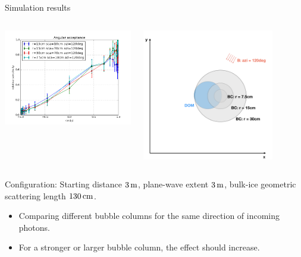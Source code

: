 \begin{frame}[fragile]{Simulation results}
  \begin{columns}
    \begin{column}{0.5\textwidth}
      \includegraphics[width=\textwidth]{img/summer_scenario_azi120deg}
    \end{column}
    \begin{column}{0.5\textwidth}
      \includegraphics[width=0.8\textwidth]{img/summerscenario-006}
    \end{column}
  \end{columns}

  \tiny Configuration: Starting distance $3\text{\,m}$, plane-wave extent $3\text{\,m}$, bulk-ice geometric scattering length $130\text{\,cm}$.
  \normalsize

  \begin{itemize}
    \item Comparing different bubble columns for the same direction of incoming photons.
    \item For a stronger or larger bubble column, the effect should increase.
  \end{itemize}
\end{frame}

